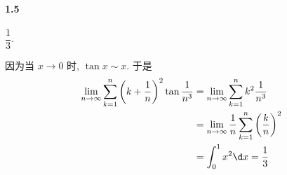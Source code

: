 \paragraph*{1.5} $\dfrac{1}{3}$.

因为当 $x\to 0$ 时, $\tan x\sim x$. 于是
\[
	\begin{aligned}
\lim_{n\to\infty}\sum_{k=1}^n\left(k+\dfrac{1}{n}\right)^2\tan\dfrac{1}{n^3}&=\lim_{n\to\infty}\sum_{k=1}^nk^2\dfrac{1}{n^3}\\
&=\lim_{n\to\infty}\dfrac{1}{n}\sum_{k=1}^n\left(\dfrac{k}{n}\right)^2\\&=\int_{0}^{1}x^2\d x=\dfrac{1}{3}
	\end{aligned}
\]
